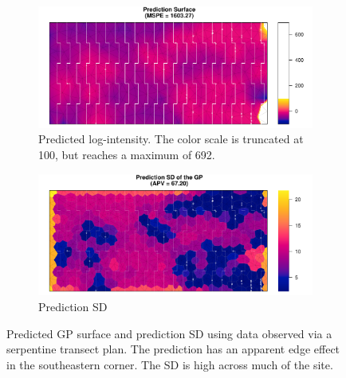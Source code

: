 \documentclass[review]{elsarticle}
\begin{document}


\begin{figure}

\begin{subfigure}{5in}
\includegraphics[width=5in]{../graphics/lambda-Serp000148-LGCP000004.pdf}
\caption{Predicted log-intensity. The color scale is truncated at 100, but
reaches a maximum of 692.}
\label{lambdaserp000148}
\end{subfigure}

\begin{subfigure}{5in}
\includegraphics[width=5in]{../graphics/lambdaSD-Serp000148-LGCP000004.pdf}
\caption{Prediction SD}
\label{sdserp000148}
\end{subfigure}

\caption{Predicted GP surface and prediction SD using data observed via a
serpentine transect plan. The prediction has an apparent edge effect in the
southeastern corner. The SD is high across much of the site.}
\label{serp000148}
\end{figure}
\end{document}
